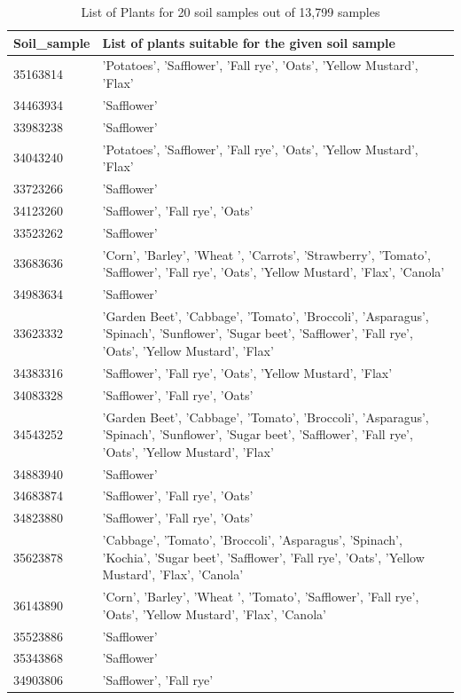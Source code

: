 \begin{table}[h!]
    \centering
    \begin{tabular}{|m{}|m{}|}
    \hline
        \textbf{Soil\_sample} & \textbf{List of plants suitable for the given soil sample} \\ \hline
        35163814 & 'Potatoes', 'Safflower', 'Fall rye', 'Oats', 'Yellow Mustard', 'Flax' \\ \hline
        34463934 & 'Safflower' \\ \hline
        33983238 & 'Safflower' \\ \hline
        34043240 & 'Potatoes', 'Safflower', 'Fall rye', 'Oats', 'Yellow Mustard', 'Flax' \\ \hline
        33723266 & 'Safflower' \\ \hline
        34123260 & 'Safflower', 'Fall rye', 'Oats' \\ \hline
        33523262 & 'Safflower' \\ \hline
        33683636 & 'Corn', 'Barley', 'Wheat ', 'Carrots', 'Strawberry', 'Tomato', 'Safflower', 'Fall rye', 'Oats', 'Yellow Mustard', 'Flax', 'Canola' \\ \hline
        34983634 & 'Safflower' \\ \hline
        33623332 & 'Garden Beet', 'Cabbage', 'Tomato', 'Broccoli', 'Asparagus', 'Spinach', 'Sunflower', 'Sugar beet', 'Safflower', 'Fall rye', 'Oats', 'Yellow Mustard', 'Flax' \\ \hline
        34383316 & 'Safflower', 'Fall rye', 'Oats', 'Yellow Mustard', 'Flax' \\ \hline
        34083328 & 'Safflower', 'Fall rye', 'Oats' \\ \hline
        34543252 & 'Garden Beet', 'Cabbage', 'Tomato', 'Broccoli', 'Asparagus', 'Spinach', 'Sunflower', 'Sugar beet', 'Safflower', 'Fall rye', 'Oats', 'Yellow Mustard', 'Flax' \\ \hline
        34883940 & 'Safflower' \\ \hline
        34683874 & 'Safflower', 'Fall rye', 'Oats' \\ \hline
        34823880 & 'Safflower', 'Fall rye', 'Oats' \\ \hline
        35623878 & 'Cabbage', 'Tomato', 'Broccoli', 'Asparagus', 'Spinach', 'Kochia', 'Sugar beet', 'Safflower', 'Fall rye', 'Oats', 'Yellow Mustard', 'Flax', 'Canola' \\ \hline
        36143890 & 'Corn', 'Barley', 'Wheat ', 'Tomato', 'Safflower', 'Fall rye', 'Oats', 'Yellow Mustard', 'Flax', 'Canola' \\ \hline
        35523886 & 'Safflower' \\ \hline
        35343868 & 'Safflower' \\ \hline
        34903806 & 'Safflower', 'Fall rye' \\ \hline
    \end{tabular}
    \caption{List of Plants for 20 soil samples out of 13,799 samples}
    \label{table:soilPlantsResult}
\end{table}


